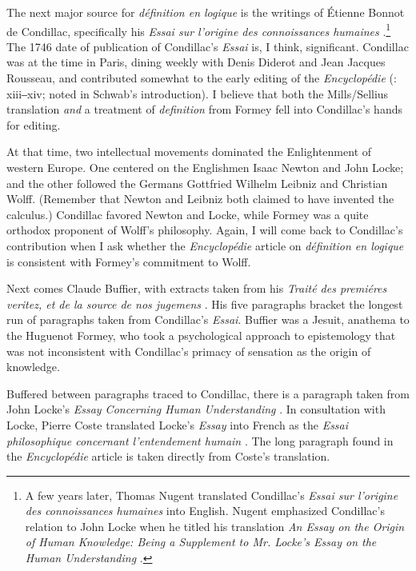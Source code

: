 \documentclass[output=paper]{langscibook}
\begin{document}
The next major source for \emph{définition en logique} is the writings of Étienne Bonnot de Condillac, specifically his \emph{Essai sur l’origine des connoissances humaines} \citep{Condillac1746}.\footnote{A few years later, Thomas Nugent translated Condillac’s \emph{Essai sur l'origine des connoissances humaines} into English. Nugent emphasized Condillac’s relation to John Locke when he titled his translation \emph{An Essay on the Origin of Human Knowledge: Being a Supplement to Mr. Locke’s Essay on the Human Understanding} \citep{Condillac1756}.}  The 1746 date of publication of Condillac’s \emph{Essai} is, I think, significant. Condillac was at the time in Paris, dining weekly with Denis Diderot and Jean Jacques Rousseau, and contributed somewhat to the early editing of the \emph{Encyclopédie} (\citealt{Dalembert1995}:  xiii‒xiv; noted in Schwab’s introduction). I believe that both the Mills/Sellius translation \emph{and} a treatment of \emph{definition} from Formey fell into Condillac’s hands for editing.

At that time, two intellectual movements dominated the Enlightenment of western Europe. One centered on the Englishmen Isaac Newton and John Locke; and the other followed the Germans Gottfried Wilhelm Leibniz and Christian Wolff. (Remember that Newton and Leibniz both claimed to have invented the calculus.) Condillac favored Newton and Locke, while Formey was a quite orthodox proponent of Wolff’s philosophy. Again, I will come back to Condillac’s contribution when I ask whether the \emph{Encyclopédie} article on \emph{définition en logique} is consistent with Formey’s commitment to Wolff.

Next comes Claude Buffier, with extracts taken from his \emph{Traité des premiéres veritez, et de la source de nos jugemens} \citep{Buffier1724}. His five paragraphs bracket the longest run of paragraphs taken from Condillac’s \emph{Essai}. Buffier was a Jesuit, anathema to the Huguenot Formey, who took a psychological approach to epistemology that was not inconsistent with Condillac’s primacy of sensation as the origin of knowledge.

Buffered between paragraphs traced to Condillac, there is a paragraph taken from John Locke’s \emph{Essay Concerning Human Understanding} \citep{Locke1700a}. In consultation with Locke, Pierre Coste translated Locke’s \emph{Essay} into French as the \emph{Essai philosophique concernant l’entendement humain} \citep{Locke1700b}. The long paragraph found in the \emph{Encyclopédie} article is taken directly from Coste’s translation.
\end{document}
